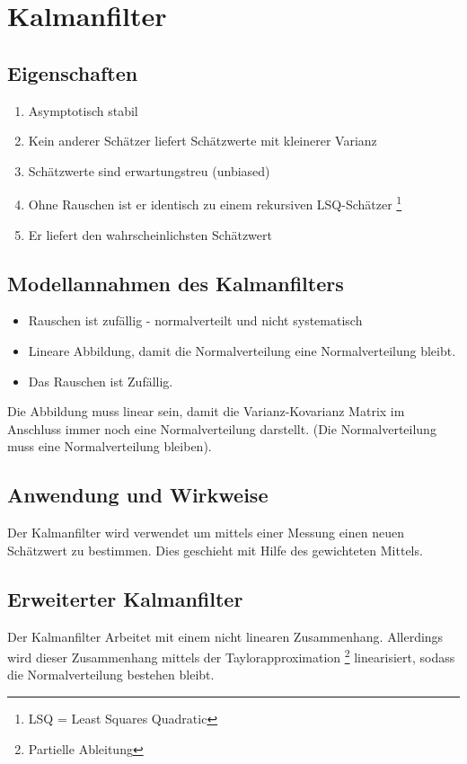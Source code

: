 \chapter{Kalmanfilter}
\label{chp:kalmanfilter}

\section{Eigenschaften}
\begin{enumerate}
	\item Asymptotisch stabil
	\item Kein anderer Schätzer liefert Schätzwerte mit kleinerer Varianz
	\item Schätzwerte sind erwartungstreu (unbiased)
	\item Ohne Rauschen ist er identisch zu einem rekursiven LSQ-Schätzer \footnote{LSQ = 	Least Squares Quadratic}
	\item Er liefert den wahrscheinlichsten Schätzwert 
\end{enumerate}

\section{Modellannahmen des Kalmanfilters}
\begin{itemize}
	\item Rauschen ist zufällig - normalverteilt und nicht systematisch
	\item Lineare Abbildung, damit die Normalverteilung eine Normalverteilung bleibt.
	\item Das Rauschen ist Zufällig.
\end{itemize}

Die Abbildung muss linear sein, damit die Varianz-Kovarianz Matrix im Anschluss immer noch eine Normalverteilung darstellt. (Die Normalverteilung muss eine Normalverteilung bleiben).

\section{Anwendung und Wirkweise}
Der Kalmanfilter wird verwendet um mittels einer Messung einen neuen Schätzwert zu bestimmen. Dies geschieht mit Hilfe des gewichteten Mittels.

\section{Erweiterter Kalmanfilter}
Der Kalmanfilter Arbeitet mit einem nicht linearen Zusammenhang. Allerdings wird dieser Zusammenhang mittels der Taylorapproximation \footnote{Partielle Ableitung} linearisiert, sodass die Normalverteilung bestehen bleibt.

